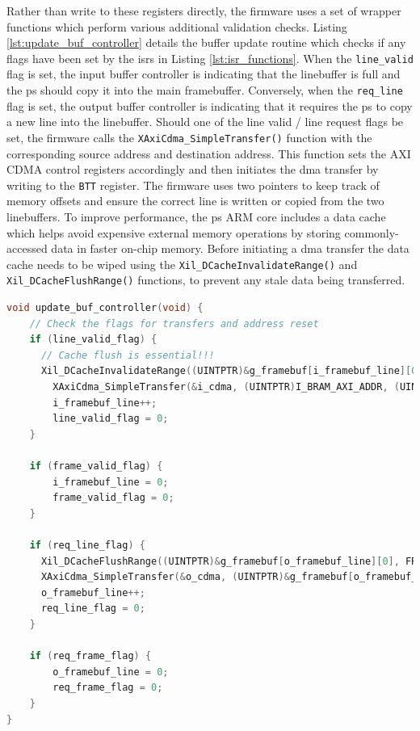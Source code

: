 Rather than write to these registers directly, the firmware uses a set of wrapper functions which perform various additional validation checks. Listing \ref{lst:update_buf_controller} details the buffer update routine which checks if any flags have been set by the \glspl{isr} in Listing \ref{lst:isr_functions}. When the \texttt{line\_valid} flag is set, the input buffer controller is indicating that the linebuffer is full and the \gls{ps} should copy it into the main framebuffer. Conversely, when the \texttt{req\_line} flag is set, the output buffer controller is indicating that it requires the \gls{ps} to copy a new line into the linebuffer. Should one of the line valid / line request flags be set, the firmware calls the \texttt{XAxiCdma\_SimpleTransfer()} function with the corresponding source address and destination address. This function sets the AXI CDMA control registers accordingly and then initiates the \gls{dma} transfer by writing to the \texttt{BTT} register. The firmware uses two pointers to keep track of memory offsets and ensure the correct line is written or copied from the two linebuffers. To improve performance, the \gls{ps} ARM core includes a data cache which helps avoid expensive external memory operations by storing commonly-accessed data in faster on-chip memory. Before initiating a \gls{dma} transfer the data cache needs to be wiped using the \texttt{Xil\_DCacheInvalidateRange()} and \texttt{Xil\_DCacheFlushRange()} functions, to prevent any stale data being transferred.

\begin{lstlisting}[caption={Buffer controller update loop}, label={lst:update_buf_controller}, language=C]
void update_buf_controller(void) {
    // Check the flags for transfers and address reset
    if (line_valid_flag) {
      // Cache flush is essential!!!
      Xil_DCacheInvalidateRange((UINTPTR)&g_framebuf[i_framebuf_line][0], FRAMEBUF_WIDTH);
        XAxiCdma_SimpleTransfer(&i_cdma, (UINTPTR)I_BRAM_AXI_ADDR, (UINTPTR)&g_framebuf[i_framebuf_line][0], FRAMEBUF_WIDTH, NULL, NULL);
        i_framebuf_line++;
        line_valid_flag = 0;
    }

    if (frame_valid_flag) {
        i_framebuf_line = 0;
        frame_valid_flag = 0;
    }

    if (req_line_flag) {
      Xil_DCacheFlushRange((UINTPTR)&g_framebuf[o_framebuf_line][0], FRAMEBUF_WIDTH);
      XAxiCdma_SimpleTransfer(&o_cdma, (UINTPTR)&g_framebuf[o_framebuf_line][0], (UINTPTR)O_BRAM_AXI_ADDR, FRAMEBUF_WIDTH, NULL, NULL);
      o_framebuf_line++;
      req_line_flag = 0;
    }

    if (req_frame_flag) {
        o_framebuf_line = 0;
        req_frame_flag = 0;
    }
} 
\end{lstlisting}

